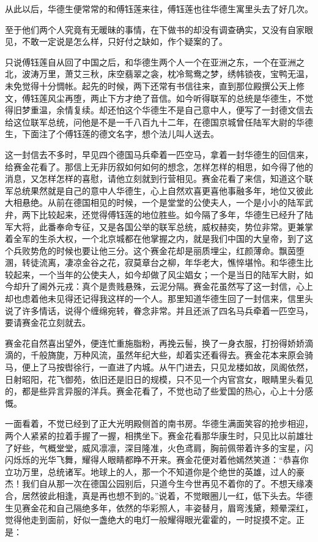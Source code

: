 \documentclass[12pt,UTF8]{ctexbook}
\begin{document}
{{{从此以后，华德生便常常的和傅钰莲来往，傅钰莲也往华德生寓里头去了好几次。

至于他们两个人究竟有无暖昧的事情，在下做书的却没有调查确实，又没有自家眼见，不敢一定说是怎么样，只好付之缺如，作个疑案的了。

只说傅钰莲自从回了中国之后，和华德生两个人一个在亚洲之东，一个在亚洲之北，波涛万里，萧艾三秋，床空翡翠之衾，枕冷鸳鸯之梦，绣帏锁夜，宝鸭无温，未免觉得十分惆帐。起先的时候，两下还常有书信往来，直到那位殿撰公天上修文，傅钰莲风尘再堕，两止下方才绝了音信。如今听得联军的总统是华德生，不觉得旧梦重温，余情复续。却还怕这个华德生不是自己意中人，便写了一封德文信去给这位联军总统，问他是不是一千八百九十二年，在德国京城曾任陆军大尉的华德生，下面注了个傅钰莲的德文名字，想个法儿叫人送去。

这一封信去不多时，早见四个德国马兵牵着一匹空马，拿着一封华德生的回信来，给赛金花看了。那信上无非历叙如何如何的想念，怎样怎样的相思，如今得了他的消息，又怎样怎样的喜慰，请他立刻就到行营相见。赛金花看了来信，知道这个联军总统果然就是自己的意中人华德生，心上自然欢喜更喜他事融多年，地位又彼此大相悬绝。从前在德国相见的时候，一个是堂堂的公使夫人，一个是小小的陆军武弁，两下比较起来，还觉得傅钰莲的地位胜些。如今隔了多年，华德生已经升了陆军大将，此番奉命专征，又是各国公举的联军总统，威权赫奕，势位非常。更兼掌着全军的生杀大权，一个北京城都在他掌握之内，就是我们中国的大皇帝，到了这个兵败势危的时候也要让他三分。这个赛金花却是丽质埋尘，红颜薄命。飘茵堕溷，转徒流离，凄凉金谷之花，寂莫章台之柳，年华老大，憔悴堪怜。和华德生比较起来，一个当年的公使夫人，如今却做了风尘娼女；一个是当日的陆军大尉，如今却升了阃外元戎：真个是贵贱悬殊，云泥分隔。赛金花虽然写了这一封信，心上却也虑着他未见得还记得我这样的一个人。那里知道华德生回了一封信来，信里头说了许多情话，说得个缠绵宛转，眷念非常。并且还派了四名马兵牵着一匹空马，要请赛金花立刻就去。

赛金花自然喜出望外，便连忙重施脂粉，再挽云髻，换了一身衣服，打扮得娇娇滴滴的，千般旖旎，万种风流，虽然年纪大些，却着实还看得去。赛金花本来原会骑马，便上了马按辔徐行，一直进了内城。从午门进去，只见龙楼如故，凤阁依然，日射昭阳，花飞御苑，依旧还是旧日的规模，只不见一个内官宫女，眼睛里头看见的，都是些异言异服的洋兵。赛金花看了，不觉也动了些爱国的热心，心上十分感慨。

一面看着，不觉已经到了正大光明殿侧首的南书房。华德生满面笑容的抢步相迎，两个人紧紧的拉着手握了一握，相携坐下。赛金花看那华康生时，只见比以前雄壮了好些，气概堂堂，威风凛凛，深目隆准，火色鸢肩，胸前佩带着许多的宝星，闪闪烁烁的光华飞舞，耀得人眼睛都睁不开来。赛金花便对着他嫣然笑道：“恭喜你立功万里，总统诸军。地球上的人，那一个不知道你是个绝世的英雄，过人的豪杰！我们自从那一次在德国公园别后，只道今生今世再见不着你的了。不想天缘凑合，居然彼此相逢，真是再也想不到的。”说着，不觉眼圈儿一红，低下头去。华德生见赛金花和自己隔绝多年，依然的华彩照人，丰姿替月，眉弯浅黛，颊晕深红，觉得他走到面前，好似一盏绝大的电灯一般耀得眼光霍霍的，一时捉摸不定。正是：

}}}
\end{document}
